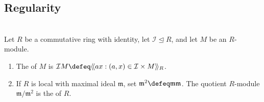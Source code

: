 \subsection{Regularity}

\begin{definition} \label{def:ideal-multiples-and-local-cotangent-module}
\\
Let $R$ be a commutative ring with identity, let $\mathcal{I}\trianglelefteq R$, and let $M$ be an $R$-module.
\begin{enumerate}[label=(\roman*)]
\setlength{\itemsep}{0pt}
\item The  of $M$ is $\mathcal{I}M\defeq\langle\!\langle ax:(a,x)\in\mathcal{I}\times M\rangle\!\rangle_R$.
\item If $R$ is local with maximal ideal $\mathfrak{m}$, set $\mathfrak{m}^2\defeq\mathfrak{m}\mathfrak{m}$. The quotient $R$-module $\mathfrak{m}/\mathfrak{m}^2$ is the  of $R$.
\end{enumerate}
\end{definition}

